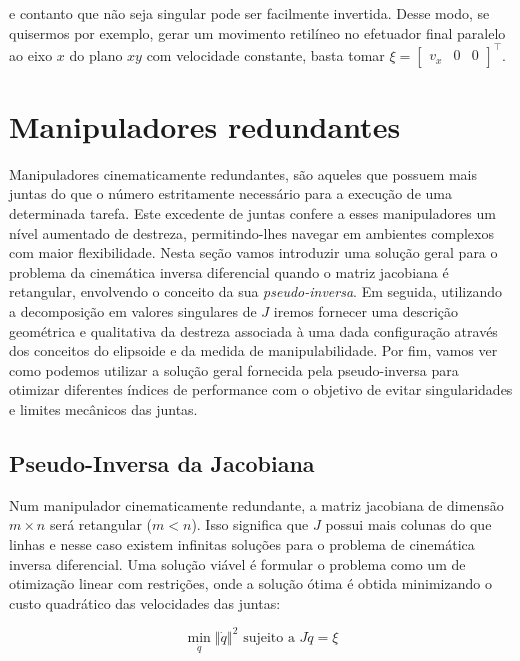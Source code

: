 e contanto que não seja singular pode ser facilmente invertida. Desse modo, se
quisermos por exemplo, gerar um movimento retilíneo no efetuador final paralelo
ao eixo \(x\) do plano \(xy\) com velocidade constante, basta tomar \(\xi = \begin{bmatrix}
    v_x & 0 & 0
\end{bmatrix}^\top\).

\section{Manipuladores redundantes}

Manipuladores cinematicamente redundantes, são aqueles que possuem mais juntas
do que o número estritamente necessário para a execução de uma determinada
tarefa. Este excedente de juntas confere a esses manipuladores um nível
aumentado de destreza, permitindo-lhes navegar em ambientes complexos com maior
flexibilidade. Nesta seção vamos introduzir uma solução geral para o problema
da cinemática inversa diferencial quando o matriz jacobiana é retangular,
envolvendo o conceito da sua \emph{pseudo-inversa}. Em seguida, utilizando a
decomposição em valores singulares de \(J\) iremos fornecer uma descrição
geométrica e qualitativa da destreza associada à uma dada configuração através
dos conceitos do elipsoide e da medida de manipulabilidade. Por fim, vamos ver
como podemos utilizar a solução geral fornecida pela pseudo-inversa para
otimizar diferentes índices de performance com o objetivo de evitar
singularidades e limites mecânicos das juntas.

\subsection{Pseudo-Inversa da Jacobiana}

Num manipulador cinematicamente redundante, a matriz jacobiana de dimensão \(m
\times n\) será retangular (\(m < n\)). Isso significa que \(J\) possui mais
colunas do que linhas e nesse caso existem infinitas soluções para o problema
de cinemática inversa diferencial. Uma solução viável é formular o problema como 
um de otimização linear com restrições, onde a solução ótima é obtida minimizando 
o custo quadrático das velocidades das juntas:

\begin{equation}
    \min_{\dot{q}} \left\Vert \dot{q} \right\Vert^2 \text{ sujeito a } J \dot{q} = \xi
\end{equation}


